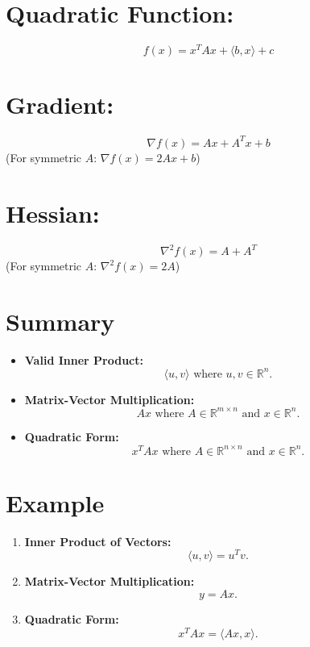 \documentclass{article}
\begin{document}
\section*{Quadratic Function:}
\[
f(x) = x^T A x + \langle b, x \rangle + c
\]

\section*{Gradient:}
\[
\nabla f(x) = Ax + A^T x + b
\]
(For symmetric \(A\): \(\nabla f(x) = 2Ax + b\))

\section*{Hessian:}
\[
\nabla^2 f(x) = A + A^T
\]
(For symmetric \(A\): \(\nabla^2 f(x) = 2A\))










\section*{Summary}
\begin{itemize}
    \item \textbf{Valid Inner Product:} 
    \[
    \langle u, v \rangle \text{ where } u, v \in \mathbb{R}^n.
    \]
    
    \item \textbf{Matrix-Vector Multiplication:} 
    \[
    Ax \text{ where } A \in \mathbb{R}^{m \times n} \text{ and } x \in \mathbb{R}^n.
    \]
    
    \item \textbf{Quadratic Form:} 
    \[
    x^T A x \text{ where } A \in \mathbb{R}^{n \times n} \text{ and } x \in \mathbb{R}^n.
    \]
\end{itemize}

\section*{Example}
\begin{enumerate}[]
    \item \textbf{Inner Product of Vectors:} 
    \[
    \langle u, v \rangle = u^T v.
    \]
    
    \item \textbf{Matrix-Vector Multiplication:} 
    \[
    y = Ax.
    \]
    
    \item \textbf{Quadratic Form:} 
    \[
    x^T A x = \langle Ax, x \rangle.
    \]
\end{enumerate}
\end{document}
